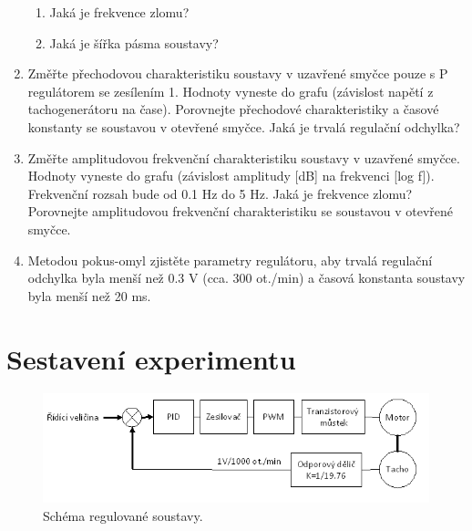 \begin{enumerate}
\begin{enumerate}
	\item Jaká je frekvence zlomu?
	\item Jaká je šířka pásma soustavy?
\end{enumerate}
\item Změřte přechodovou charakteristiku soustavy v uzavřené smyčce pouze s P regulátorem se zesílením 1. Hodnoty vyneste do grafu (závislost napětí z tachogenerátoru na čase). Porovnejte přechodové charakteristiky a časové konstanty se soustavou v otevřené smyčce. Jaká je trvalá regulační odchylka?
\item Změřte amplitudovou frekvenční charakteristiku soustavy v uzavřené smyčce. Hodnoty vyneste do grafu (závislost amplitudy [dB] na frekvenci [log f]). Frekvenční rozsah bude od 0.1 Hz do 5 Hz. Jaká je frekvence zlomu? Porovnejte amplitudovou frekvenční charakteristiku se soustavou v otevřené smyčce.
\item Metodou pokus-omyl zjistěte parametry regulátoru, aby trvalá regulační odchylka byla menší než 0.3 V (cca. 300 ot./min) a časová konstanta soustavy byla menší než 20 ms.
\end{enumerate}



\section{Sestavení experimentu}

\begin{figure}[!hbt]
	\centering
	\includegraphics[]{img/schema_regulovane_soustavy.png} 
	\caption{Schéma regulované soustavy.} 
	\label{fig:schema_reg}
\end{figure}	

